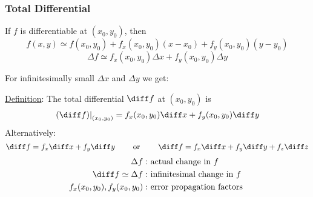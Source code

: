 
\begin{frame}
  \frametitle{Total Differential}

If $f$ is differentiable at $(x_0,y_0)$, then
%
$$f(x,y) \simeq f(x_0,y_0)+ f_x(x_0,y_0)(x-x_0) + f_y(x_0,y_0) (y-y_0)$$
%
$$\Delta f \simeq f_x(x_0,y_0) \Delta x + f_y(x_0,y_0) \Delta y$$

\pause For infinitesimally small $\Delta x$ and $\Delta y$ we get:

\underline{Definition}: The \textcolor[rgb]{0.98,0.00,0.00}{total differential} $\diff f$ at $(x_0,y_0)$ is
%
$$\left. (\diff f) \right|_{(x_0,y_0)} = f_x(x_0,y_0) \diff x + f_y(x_0,y_0) \diff y$$
%
\pause Alternatively:
%
$$\diff f = f_x \diff x + f_y \diff y \qquad \text{ or } \qquad  \diff f = f_x \diff x + f_y \diff y + f_z \diff z$$
%
\begin{align*}
  \Delta f: & \text{ actual change in } f\\
  \diff f \simeq \Delta f: & \text{ infinitesimal change in } f\\
  f_x(x_0,y_0), f_y(x_0,y_0): & \text{ error propagation factors }
\end{align*}

\end{frame}